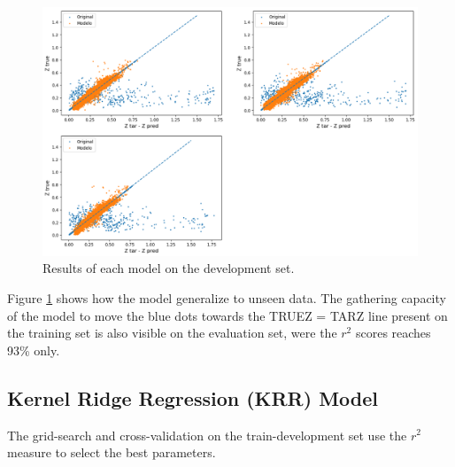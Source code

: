 \begin{figure}[th!]
	\centering
	\includegraphics[width=1.0\linewidth]{TeX_files/Imagenes/svr-test}
	\caption{Results of each model on the development set.}
	\label{fig:svr-test}
\end{figure}
Figure \ref{fig:svr-test} shows how the model generalize to unseen data. The gathering capacity of the model to move the blue dots towards the TRUEZ = TARZ line present on the training set is also visible on the evaluation set, were the $r^2$ scores reaches 93\% only. 
\subsection{Kernel Ridge Regression (KRR) Model}

The grid-search and cross-validation on the train-development set use the $r^2$ measure to select the best parameters. 

